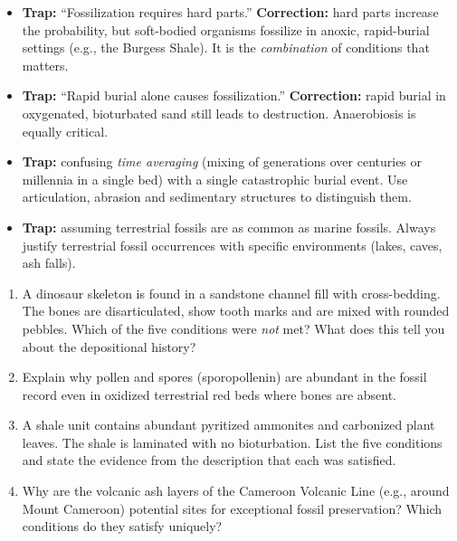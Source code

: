\documentclass[11pt]{article}
\begin{document}
\begin{attention}
\begin{itemize}
    \item \textbf{Trap:} ``Fossilization requires hard parts.'' \textbf{Correction:} hard parts increase the probability, but soft-bodied organisms fossilize in anoxic, rapid-burial settings (e.g., the Burgess Shale). It is the \emph{combination} of conditions that matters.
    \item \textbf{Trap:} ``Rapid burial alone causes fossilization.'' \textbf{Correction:} rapid burial in oxygenated, bioturbated sand still leads to destruction. Anaerobiosis is equally critical.
    \item \textbf{Trap:} confusing \emph{time averaging} (mixing of generations over centuries or millennia in a single bed) with a single catastrophic burial event. Use articulation, abrasion and sedimentary structures to distinguish them.
    \item \textbf{Trap:} assuming terrestrial fossils are as common as marine fossils. Always justify terrestrial fossil occurrences with specific environments (lakes, caves, ash falls).
\end{itemize}
\end{attention}

\begin{exercice}
\begin{enumerate}
    \item A dinosaur skeleton is found in a sandstone channel fill with cross-bedding. The bones are disarticulated, show tooth marks and are mixed with rounded pebbles. Which of the five conditions were \emph{not} met? What does this tell you about the depositional history?
    \item Explain why pollen and spores (sporopollenin) are abundant in the fossil record even in oxidized terrestrial red beds where bones are absent.
    \item A shale unit contains abundant pyritized ammonites and carbonized plant leaves. The shale is laminated with no bioturbation. List the five conditions and state the evidence from the description that each was satisfied.
    \item Why are the volcanic ash layers of the Cameroon Volcanic Line (e.g., around Mount Cameroon) potential sites for exceptional fossil preservation? Which conditions do they satisfy uniquely?
\end{enumerate}
\end{exercice}
\end{document}
